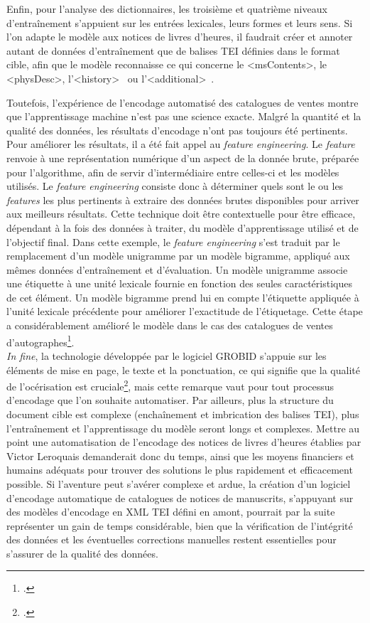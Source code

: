\documentclass[a4paper,12pt,twoside]{book}
\begin{document}
Enfin, pour l'analyse des dictionnaires, les troisième et quatrième niveaux d'entraînement s'appuient sur les entrées lexicales, leurs formes et leurs sens. Si l'on adapte le modèle aux notices de livres d'heures, il faudrait créer et annoter autant de données d'entraînement que de balises TEI définies dans le format cible, afin que le modèle reconnaisse ce qui concerne le \textless msContents\textgreater, le \textless physDesc\textgreater, l'\textless history\textgreater~ ou l'\textless additional\textgreater~.
	
	Toutefois, l'expérience de l'encodage automatisé des catalogues de ventes montre que l'apprentissage machine n'est pas une science exacte. Malgré la quantité et la qualité des données, les résultats d'encodage n'ont pas toujours été pertinents. Pour améliorer les résultats, il a été fait appel au \textit{feature engineering}. Le \textit{feature} renvoie à une représentation numérique d'un aspect de la donnée brute, préparée pour l'algorithme, afin de servir d'intermédiaire entre celles-ci et les modèles utilisés. Le \textit{feature engineering} consiste donc à déterminer quels sont le ou les \textit{features} les plus pertinents à extraire des données brutes disponibles pour arriver aux meilleurs résultats. Cette technique doit être contextuelle pour être efficace, dépendant à la fois des données à traiter, du modèle d'apprentissage utilisé et de l'objectif final. Dans cette exemple, le \textit{feature engineering} s'est traduit par le remplacement d’un modèle unigramme par un modèle bigramme, appliqué aux mêmes données d’entraînement et d’évaluation. Un modèle unigramme associe une étiquette à une unité lexicale fournie en fonction des seules caractéristiques de cet élément. Un modèle bigramme prend lui en compte l’étiquette appliquée à l'unité lexicale précédente pour améliorer l’exactitude de l’étiquetage. Cette étape a considérablement amélioré le modèle dans le cas des catalogues de ventes d'autographes\footcite[p. 42-44]{encoder_auto_catalogue}. \\
	
	\textit{In fine}, la technologie développée par le logiciel GROBID s'appuie sur les éléments de mise en page, le texte et la ponctuation, ce qui signifie que la qualité de l'océrisation est cruciale\footcite[p. 59]{Grobid_catalogues}, mais cette remarque vaut pour tout processus d'encodage que l'on souhaite automatiser. Par ailleurs, plus la structure du document cible est complexe (enchaînement et imbrication des balises TEI), plus l'entraînement et l'apprentissage du modèle seront longs et complexes. Mettre au point une automatisation de l'encodage des notices de livres d'heures établies par Victor Leroquais demanderait donc du temps, ainsi que les moyens financiers et humains adéquats pour trouver des solutions le plus rapidement et efficacement possible. Si l'aventure peut s'avérer complexe et ardue, la création d'un logiciel d'encodage automatique de catalogues de notices de manuscrits, s'appuyant sur des modèles d'encodage en XML TEI défini en amont, pourrait par la suite représenter un gain de temps considérable, bien que la vérification de l'intégrité des données et les éventuelles corrections manuelles restent essentielles pour s'assurer de la qualité des données. \\
	
\end{document}

